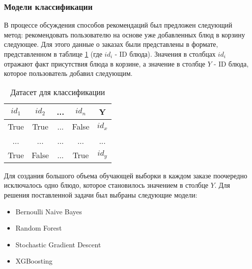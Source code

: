 \subsubsection{Модели классификации}
В процессе обсуждения способов рекомендаций был предложен следующий метод: рекомендовать
пользователю на основе уже добавленных блюд в корзину следующее. Для этого данные о заказах были
представлены в формате, представленном в таблице \ref{table:1} (где $id_i$ - ID блюда).
Значения в столбцах $id_i$ отражают факт присутствия блюда в корзине, а значение в
столбце $Y$ - ID блюда, которое пользователь добавил следующим.
\begin{table}[H]
  \centering
  \begin{tabular} { | c | c | c | c | c | }
  \hline
  $id_1$ & $id_2$ & ... & $id_n$ & Y \\
  \hline
  True  & True  & ... & False & $id_x$ \\
  \hline
  ...  & ...  & ... & ... & ... \\
  \hline
  True  & False  & ... & True & $id_y$ \\
  \hline
  \end{tabular}
  \caption{Датасет для классификации}
  \label{table:1}
\end{table}
Для создания большого объема обучающей выборки в каждом заказе поочередно исключалось
одно блюдо, которое становилось значением в столбце $Y$. Для решения поставленной
задачи был выбраны следующие модели:
\begin{itemize}
  \item Bernoulli Naive Bayes \cite{BernoulliNB}
  \item Random Forest \cite{RandomForest}
  \item Stochastic Gradient Descent \cite{SGD}
  \item XGBoosting \cite{XGBoosting}
\end{itemize}
